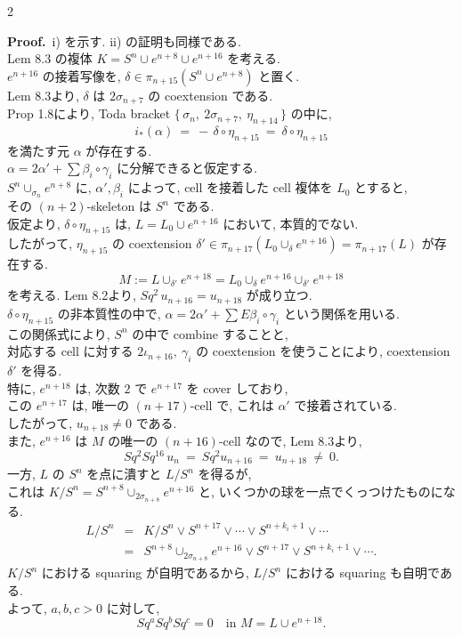 \documentclass[10pt, leqno]{ltjsarticle}
\newcommand{\Ex}{E}        %
\newcommand{\toda}[1]{\{\,#1\,\}}              %
\newcommand{\pis}[2]{\pi_{#1}(#2)}       %
\numberwithin{equation}{section}
\theoremstyle{plain}
\theoremstyle{definition}
\theoremstyle{remark}
\begin{document}
\begin{paracol}{2}

\noindent
\textbf{Proof.}\
i) を示す.  ii) の証明も同様である. \\
Lem 8.3 の複体
\(
K=S^n\cup e^{n+8}\cup e^{n+16}
\)
を考える. \\
$e^{n+16}$ の接着写像を,
\(
\delta\in \pis{n+15}{S^n\cup e^{n+8}}
\)
と置く. \\
Lem 8.3より, $\delta$ は $2\sigma_{n+7}$ の coextension である. \\
Prop 1.8により,  Toda bracket 
\(
\toda{\sigma_n,\ 2\sigma_{n+7},\ \eta_{n+14}}
\)
の中に,
\[
i_*(\alpha)\ =\ -\,\delta\circ\eta_{n+15}\ =\ \delta\circ\eta_{n+15}
\]
を満たす元 $\alpha$ が存在する.\\
\(
\alpha = 2\alpha' + \sum \beta_i\circ\gamma_i
\)
に分解できると仮定する. \\
\(S^n\cup_{\sigma_n}e^{n+8}\) に, 
$\alpha',\beta_i$ によって, cell を接着した cell 複体を $L_0$ とすると,\\
その \((n+2)\)-skeleton は \(S^n\) である.\\
仮定より, $\delta\circ\eta_{n+15}$ は,
\(
L = L_0\cup e^{n+16}
\)
において, 本質的でない. \\
したがって, $\eta_{n+15}$ の coextension 
\(
\delta'\in\pis{n+17}{L_0\cup_{\delta}e^{n+16}} = \pis{n+17}{L}
\)
が存在する. \\
\[
M := L \cup_{\delta'} e^{n+18}
  = L_0 \cup_{\delta} e^{n+16} \cup_{\delta'} e^{n+18}
\]
を考える. Lem 8.2より,
\(
Sq^2\,u_{n+16}=u_{n+18}
\)
が成り立つ. \\
$\delta\circ\eta_{n+15}$ の非本質性の中で,
\(
\alpha=2\alpha'+\sum \Ex\beta_i\circ\gamma_i
\)
という関係を用いる.\\
この関係式により, 
\(S^n\) の中で combine することと,\\
対応する cell に対する
$2\iota_{n+16}, \ \gamma_i$ の coextension を使うことにより, 
coextension \(\delta'\) を得る.\\
特に, $e^{n+18}$ は, 次数 $2$ で $e^{n+17}$ を cover しており, \\
この $e^{n+17}$ は, 唯一の $(n+17)$-cell で,
これは $\alpha'$ で接着されている. \\
したがって, \(u_{n+18}\neq0\) である. \\
また, $e^{n+16}$ は $M$ の唯一の $(n+16)$-cell なので, 
Lem 8.3より,
\[
Sq^2Sq^{16}\,u_n
 \ =\ Sq^2 u_{n+16}
 \ =\ u_{n+18}\ \neq\ 0 .
\]
一方, $L$ の $S^n$ を点に潰すと
\(
L/S^n
\)
を得るが, \\
これは
\(
K/S^n=S^{n+8}\cup_{2\sigma_{n+8}}e^{n+16}
\)
と, いくつかの球を一点でくっつけたものになる. 
\[
\begin{array}{lcl}
  L/S^n 
  & = & K/S^n\vee S^{n+17}\vee\cdots\vee S^{n+k_i+1}\vee\cdots\\
  & = & S^{n+8}\cup_{2\sigma_{n+8}}e^{n+16} \vee S^{n+17}\vee S^{n+k_i+1}\vee\cdots.  
\end{array}
\]
$K/S^n$ における squaring が自明であるから, 
$L/S^n$ における squaring も自明である.\\
よって, $a,b,c>0$ に対して,
\[
Sq^aSq^bSq^c=0
\quad\text{in } M=L\cup e^{n+18}.
\]


\end{paracol}
\end{document}
